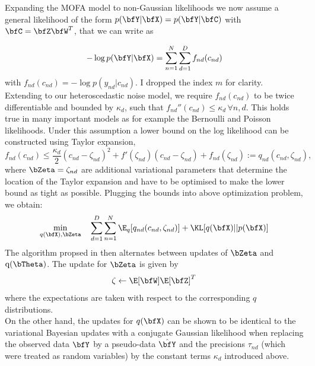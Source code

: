 Expanding the MOFA model to non-Gaussian likelihoods we now assume a general likelihood of the form $p(\bfY|\bfX)=p(\bfY|\bfC)$ with $\bfC = \bfZ\bfW^{T}$, that we can write as

\begin{equation*}
-\log p(\bfY|\bfX) = \sum_{n=1}^{N} \sum_{d=1}^{D} f_{nd} (c_{nd})
\end{equation*}
with $f_{nd}(c_{nd}) = -\log p(y_{nd}|c_{nd})$. I dropped the index $m$ for clarity.\\
Extending \cite{Seeger2012} to our heteroscedastic noise model, we require $f_{nd}(c_{nd})$ to be twice differentiable and bounded by $\kappa_d$, such that $f_{nd}''(c_{nd}) \leq \kappa_d \,\forall n,d$. This holds true in many important models as for example the Bernoulli and Poisson likelihoods. Under this assumption a lower bound on the log likelihood can be constructed using Taylor expansion,
\begin{equation*}
f_{nd}(c_{nd}) \leq \frac{\kappa_d}{2} (c_{nd} - \zeta_{nd})^2 + f'(\zeta_{nd})(c_{nd} - \zeta_{nd}) + f_{nd}(\zeta_{nd}) := q_{nd}(c_{nd},\zeta_{nd}),
\end{equation*}
where $\bZeta =  \zeta_{nd} $ are additional variational parameters that determine the location of the Taylor expansion and have to be optimised to make the lower bound as tight as possible. Plugging the bounds into above optimization problem, we obtain:
\begin{equation*}
\min_{q(\bfX),\bZeta} \quad \sum_{d=1}^{D}\sum_{n=1}^{N} \E_q [ q_{nd}(c_{nd},\zeta_{nd})] + \KL[q(\bfX)||p(\bfX)]
\end{equation*}
The algorithm propsed in \cite{Seeger2012} then alternates between updates of $\bZeta$ and $\mathrm{q}(\bTheta)$. The update for $\bZeta$ is given by
\begin{equation*}
\zeta \leftarrow \E[\bfW]\E[\bfZ]^{T}
\end{equation*}
where the expectations are taken with respect to the corresponding $q$ distributions.\\
On the other hand, the updates for $q(\bfX)$ can be shown to be identical to the variational Bayesian updates with a conjugate Gaussian likelihood when replacing the observed data $\bfY$ by a pseudo-data $\hat{\bfY}$ and the precisions $\tau_{nd}$ (which were treated as random variables) by the constant terms $\kappa_d$ introduced above. 

